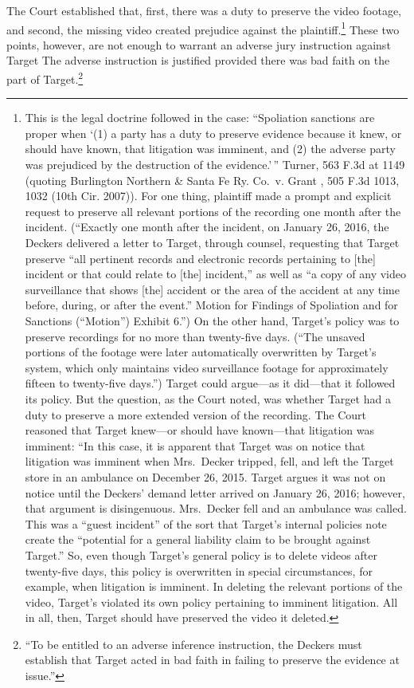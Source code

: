 \documentclass[
  10pt,
  dvipsnames,enabledeprecatedfontcommands]{scrartcl}
\begin{document}
The Court established that, first, there was a duty to preserve the
video footage, and second, the missing video created prejudice against
the plaintiff.\footnote{This is the legal doctrine followed in the case:
  ``Spoliation sanctions are proper when `(1) a party has a duty to
  preserve evidence because it knew, or should have known, that
  litigation was imminent, and (2) the adverse party was prejudiced by
  the destruction of the evidence.'\,'' Turner, 563 F.3d at 1149
  (quoting Burlington Northern \& Santa Fe Ry. Co.~v. Grant , 505 F.3d
  1013, 1032 (10th Cir. 2007)). For one thing, plaintiff made a prompt
  and explicit request to preserve all relevant portions of the
  recording one month after the incident. (``Exactly one month after the
  incident, on January 26, 2016, the Deckers delivered a letter to
  Target, through counsel, requesting that Target preserve ``all
  pertinent records and electronic records pertaining to {[}the{]}
  incident or that could relate to {[}the{]} incident,'' as well as ``a
  copy of any video surveillance that shows {[}the{]} accident or the
  area of the accident at any time before, during, or after the event.''
  Motion for Findings of Spoliation and for Sanctions (``Motion'')
  Exhibit 6.'') On the other hand, Target's policy was to preserve
  recordings for no more than twenty-five days. (``The unsaved portions
  of the footage were later automatically overwritten by Target's
  system, which only maintains video surveillance footage for
  approximately fifteen to twenty-five days.'') Target could argue---as
  it did---that it followed its policy. But the question, as the Court
  noted, was whether Target had a duty to preserve a more extended
  version of the recording. The Court reasoned that Target knew---or
  should have known---that litigation was imminent: ``In this case, it
  is apparent that Target was on notice that litigation was imminent
  when Mrs.~Decker tripped, fell, and left the Target store in an
  ambulance on December 26, 2015. Target argues it was not on notice
  until the Deckers' demand letter arrived on January 26, 2016; however,
  that argument is disingenuous. Mrs.~Decker fell and an ambulance was
  called. This was a ``guest incident'' of the sort that Target's
  internal policies note create the ``potential for a general liability
  claim to be brought against Target.'' So, even though Target's general
  policy is to delete videos after twenty-five days, this policy is
  overwritten in special circumstances, for example, when litigation is
  imminent. In deleting the relevant portions of the video, Target's
  violated its own policy pertaining to imminent litigation. All in all,
  then, Target should have preserved the video it deleted.} These two
points, however, are not enough to warrant an adverse jury instruction
against Target The adverse instruction is justified provided there was
bad faith on the part of Target.\footnote{``To be entitled to an adverse
  inference instruction, the Deckers must establish that Target acted in
  bad faith in failing to preserve the evidence at issue.''}
\end{document}
